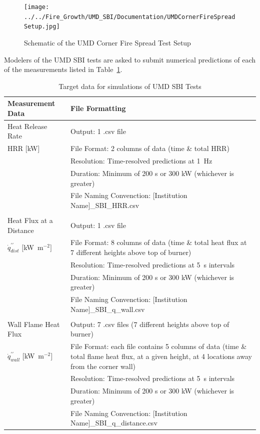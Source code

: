 \documentclass[12pt]{article}
\newcommand{\pp}{\prime\prime}
\begin{document}
\begin{figure}
     \centering
         \texttt{[image: ../../Fire\_Growth/UMD\_SBI/Documentation/UMDCornerFireSpreadSetup.jpg]}
         \caption{Schematic of the UMD Corner Fire Spread Test Setup}
         \label{fig:UMDCornerFireSpreadSetup}
\end{figure}

Modelers of the UMD SBI tests are asked to submit numerical predictions of each of the measurements listed in Table~\ref{table:SBI}.
\begin{table}[htb]
\caption{Target data for simulations of UMD SBI Tests}
\label{table:SBI} 
\begin{tabular}{p{0.25\linewidth} | p{0.75\linewidth}}
\hline
\textbf{Measurement Data}       	& \textbf{File Formatting } \\
\hline
Heat Release Rate 	& Output: 1 .csv file\\
HRR $[$kW$]$& File Format: 2 columns of data (time \& total HRR)\\
	& Resolution: Time-resolved predictions at 1~Hz \\
	& Duration: Minimum of 200 s or 300 kW (whichever is greater) \\
	& File Naming Convenction: [Institution Name]\_SBI\_HRR.csv \\
&	\\
Heat Flux at a Distance  & Output: 1 .csv file\\
$\dot{q}^{\pp}_{dist}$ $[$kW~m$^{-2}$$]$& File Format: 8 columns of data (time \& total heat flux at 7 different heights above top of burner)\\
	& Resolution: Time-resolved predictions at 5~s intervals \\
	& Duration: Minimum of 200 s or 300 kW (whichever is greater) \\
	& File Naming Convenction: [Institution Name]\_SBI\_q\_wall.csv \\
&	\\
Wall Flame Heat Flux & Output: 7 .csv files (7 different heights above top of burner) \\
$\dot{q}^{\pp}_{wall}$ $[$kW~m$^{-2}$$]$& File Format: each file contains 5 columns of data (time \& total flame heat flux, at a given height, at 4 locations away from the corner wall)\\
	& Resolution: Time-resolved predictions at 5~s intervals \\
	& Duration: Minimum of 200 s or 300 kW (whichever is greater) \\
	& File Naming Convenction: [Institution Name]\_SBI\_q\_distance.csv \\
\hline
\end{tabular}
\end{table}
\end{document}
